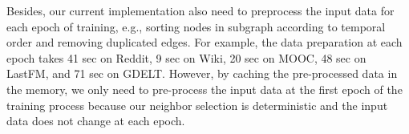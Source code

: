\begin{table}[h]
\centering
\caption{Comparison on the number of model parameters. }\label{table:number_of_params}
\vspace{-3mm}
\vspace{-2mm}
\end{table}


Besides, our current implementation also need to preprocess the input data for each epoch of training, e.g., sorting nodes in subgraph according to temporal order and removing duplicated edges.
For example, the data preparation at each epoch takes 41 sec on Reddit, 9 sec on Wiki, 20 sec on MOOC, 48 sec on LastFM, and 71 sec on GDELT. 
However, by caching the pre-processed data in the memory, we only need to pre-process the input data at the first epoch of the training process because our neighbor selection is deterministic and the input data does not change at each epoch.





